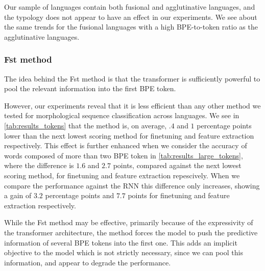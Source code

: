 \documentclass[11pt]{article}
\newcommand\adam[1]{(\textbf{Adam:} #1)}
\begin{document}
        Our sample of languages contain both fusional and
     agglutinative languages, and the typology does not appear to have
     an effect in our experiments. We see about the same trends for
     the fusional languages with a high BPE-to-token ratio as the
     agglutinative languages.

    

    \subsubsection{Fst method}

            The idea behind the Fst method is that the transformer is
     sufficiently powerful to pool the relevant information into the
     first BPE token.
    
                            However, our experiments reveal that it is
     less efficient than any other method we tested for morphological
     sequence classification across languages. We see in
     \cref{tab:results_tokens} that the method is, on average, $.4$
     and $1$ percentage points lower than the next lowest scoring
     method for finetuning and feature extraction respectively.
             This effect is further enhanced when we consider the
     accuracy of words composed of more than two BPE token in
     \cref{tab:results_large_tokens}, where the difference is $1.6$
     and $2.7$ points, compared against the next lowest scoring
     method, for finetuning and feature extraction repescively. When
     we compare the performance against the RNN this difference only
     increases, showing a gain of $3.2$ percentage points and $7.7$
     points for finetuning and feature extraction respectively.

                         While the Fst method may be effective,
     primarily because of the expressivity of the transformer
     architecture, the method forces the model to push the predictive
     information of several BPE tokens into the first one. This adds
     an implicit objective to the model which is not strictly
     necessary, since we can pool this information, and appear to
     degrade the performance.
\end{document}
